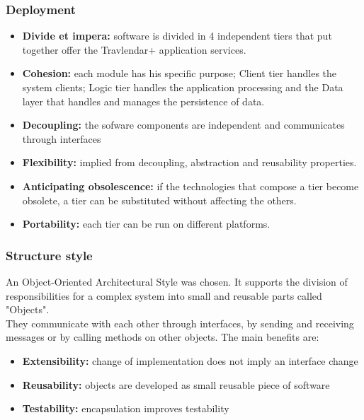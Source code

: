 \subsubsection{Deployment}
\begin{itemize}
\item \textbf{Divide et impera:} software is divided in 4 independent tiers that put together offer the Travlendar+ application services.
\item \textbf{Cohesion:} each module has his specific purpose; Client tier handles the system clients; Logic tier handles the application processing and the Data layer that handles and manages the persistence of data.
\item \textbf{Decoupling:} the sofware components are independent and communicates through interfaces 
\item \textbf{Flexibility:} implied from decoupling, abstraction and reusability properties.
\item \textbf{Anticipating obsolescence:} if the technologies that compose a tier become obsolete, a tier can be substituted without affecting the others.
\item \textbf{Portability:} each tier can be run on different platforms.
\end{itemize}



\subsubsection{Structure style}
An Object-Oriented Architectural Style was chosen. It supports the division of responsibilities for a complex system into small and reusable parts called "Objects".
\\They communicate with each other through interfaces, by sending and receiving messages or by calling methods on other objects. 
The main benefits are: 
\begin{itemize}
\item \textbf{Extensibility:} change of implementation does not imply an interface change
\item \textbf{Reusability:} objects are developed as small reusable piece of software 
\item \textbf{Testability:} encapsulation improves testability

\end{itemize}  

